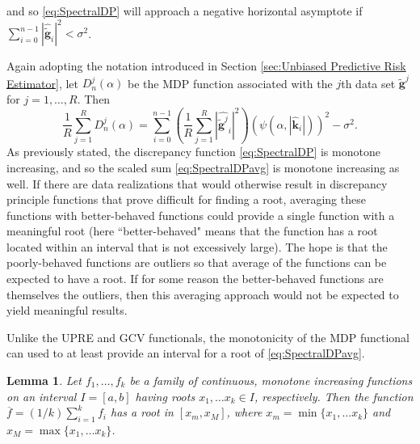 \documentclass[12pt]{article}
\newcommand{\gnoise}{\widetilde{\mathbf{g}}}
\newcommand{\kdis}{\mathbf{k}}
\newcommand{\regparam}{\alpha}
\newcommand{\mfilt}{\psi}
\newcommand{\noiseSD}{\sigma}	%
\newcommand{\D}{D}	%
\newtheorem*{lemma}{Lemma}
\begin{document}
and so \eqref{eq:SpectralDP} will approach a negative horizontal asymptote if $\sum_{i = 0}^{n-1} |\widehat{\gnoise}_i|^2 < \noiseSD^2$. \par 
Again adopting the notation introduced in Section \ref{sec:Unbiased Predictive Risk Estimator}, let $\D_n^j(\regparam)$ be the MDP function associated with the $j$th data set $\gnoise^j$ for $j = 1,\ldots,R$. Then 
\begin{equation}
\frac{1}{R}\sum_{j=1}^R \D_n^j(\regparam)  = \sum_{i = 0}^{n-1} \left(\frac{1}{R} \sum_{j=1}^R |\widehat{\gnoise^j}_i|^2\right)(\mfilt(\regparam,|\widehat{\kdis}_i|))^2 - \noiseSD^2. 
\label{eq:SpectralDPavg}
\end{equation}
As previously stated, the discrepancy function \eqref{eq:SpectralDP} is monotone increasing, and so the scaled sum \eqref{eq:SpectralDPavg} is monotone increasing as well. If there are data realizations that would otherwise result in discrepancy principle functions that prove difficult for finding a root, averaging these functions with better-behaved functions could provide a single function with a meaningful root (here ``better-behaved" means that the function has a root located within an interval that is not excessively large). The hope is that the poorly-behaved functions are outliers so that average of the functions can be expected to have a root. If for some reason the better-behaved functions are themselves the outliers, then this averaging approach would not be expected to yield meaningful results. \par 
Unlike the UPRE and GCV functionals, the monotonicity of the MDP functional can used to at least provide an interval for a root of \eqref{eq:SpectralDPavg}. 
\begin{lemma}
Let $f_1,\ldots,f_k$ be a family of continuous, monotone increasing functions on an interval $I = [a,b]$ having roots $x_1,\ldots x_k \in I$, respectively. Then the function $\overline{f} = (1/k)\sum_{i=1}^k f_i$ has a root in $[x_m,x_M]$, where $x_m = \min\{x_1,\ldots x_k\}$ and $x_M = \max\{x_1,\ldots x_k\}$.
\end{lemma}
\end{document}
